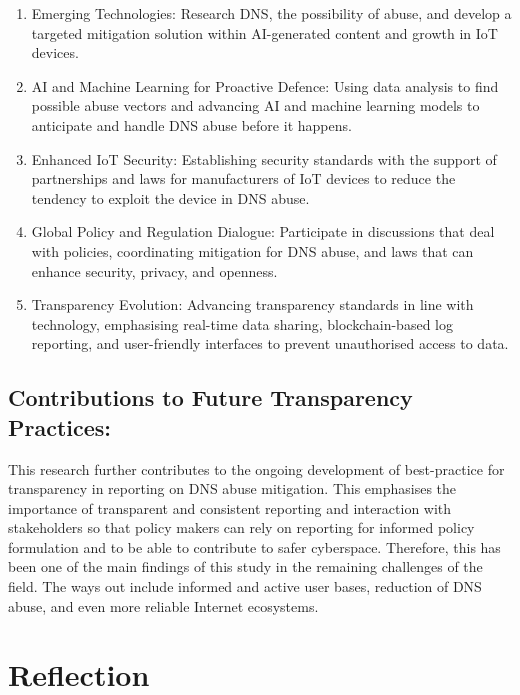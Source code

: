 \begin{enumerate}
    \item Emerging Technologies: Research DNS, the possibility of abuse, and develop a targeted mitigation solution within AI-generated content and growth in IoT devices.

    \item AI and Machine Learning for Proactive Defence: Using data analysis to find possible abuse vectors and advancing AI and machine learning models to anticipate and handle DNS abuse before it happens.

    \item Enhanced IoT Security: Establishing security standards with the support of partnerships and laws for manufacturers of IoT devices to reduce the tendency to exploit the device in DNS abuse.

    \item Global Policy and Regulation Dialogue: Participate in discussions that deal with policies, coordinating mitigation for DNS abuse, and laws that can enhance security, privacy, and openness.

    \item Transparency Evolution: Advancing transparency standards in line with technology, emphasising real-time data sharing, blockchain-based log reporting, and user-friendly interfaces to prevent unauthorised access to data.

    
\end{enumerate}


\subsection{Contributions to Future Transparency Practices:}

This research further contributes to the ongoing development of best-practice for transparency in reporting on DNS abuse mitigation. This emphasises the importance of transparent and consistent reporting and interaction with stakeholders so that policy makers can rely on reporting for informed policy formulation and to be able to contribute to safer cyberspace. Therefore, this has been one of the main findings of this study in the remaining challenges of the field. The ways out include informed and active user bases, reduction of DNS abuse, and even more reliable Internet ecosystems.


\section{Reflection}
